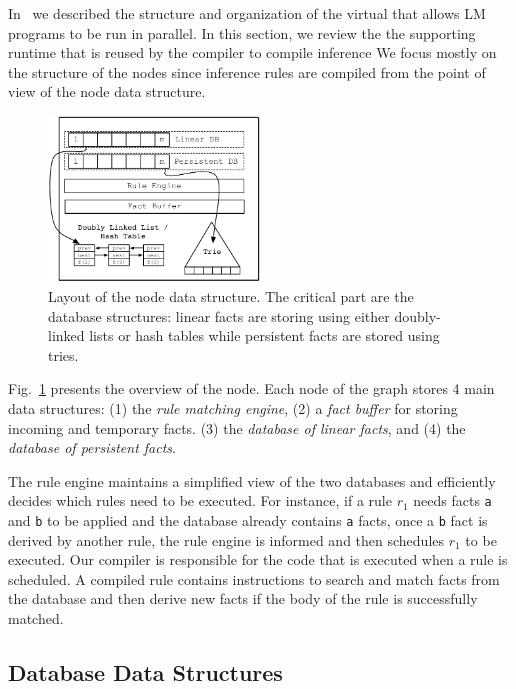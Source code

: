 In~\cite{cruz-ppdp14} we described the structure and organization of the virtual
that allows LM programs to be run in parallel. In this section, we review the
the supporting runtime that is reused by the compiler to compile inference We
focus mostly on the structure of the nodes since inference rules are compiled
from the point of view of the node data structure.

\begin{figure}
\begin{center}
   \includegraphics[width=0.5\textwidth]{figures/overview.pdf}
\end{center}
\caption{Layout of the node data structure. The critical part are the
   database structures: linear facts are storing using either doubly-linked lists or hash
tables while persistent facts are stored using tries.}
\label{fig:node}
\end{figure}

Fig.~\ref{fig:node} presents the overview of the node.  Each node of the graph
stores 4 main data structures: (1) the \emph{rule matching engine}, (2) a
\emph{fact buffer} for
storing incoming and temporary facts.  (3) the \emph{database of linear facts}, and (4)
the \emph{database of persistent facts}.

The rule engine maintains a simplified view of the two databases and efficiently
decides which rules need to be executed. For instance, if a rule $r_1$ needs
facts \texttt{a} and \texttt{b} to be applied and the database already contains
\texttt{a} facts, once a \texttt{b} fact is derived by another rule, the rule
engine is informed and then schedules $r_1$ to be executed. Our compiler is
responsible for the code that is executed when a rule is scheduled.  A compiled
rule contains instructions to search and match facts from the database and then
derive new facts if the body of the rule is successfully matched.

\subsection{Database Data Structures}\label{sec:data_structures}

